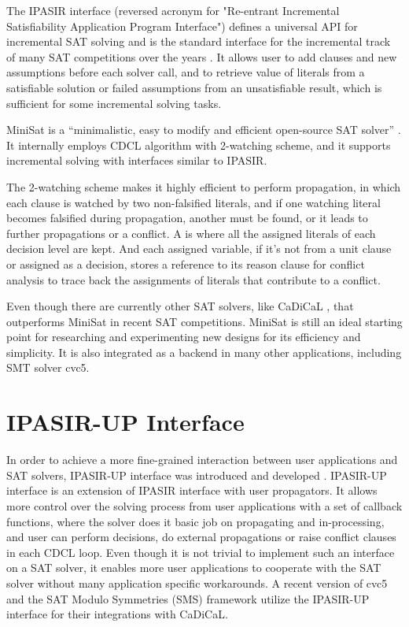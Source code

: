 The IPASIR interface (reversed acronym for "Re-entrant Incremental Satisfiability Application Program Interface") defines a universal API for incremental SAT solving and is the standard interface for the incremental track of many SAT competitions over the years \cite{BALYO201645}. It allows user to add clauses and new assumptions before each solver call, and to retrieve value of literals from a satisfiable solution or failed assumptions from an unsatisfiable result, which is sufficient for some incremental solving tasks.

MiniSat is a ``minimalistic, easy to modify and efficient open-source SAT solver'' \cite{10.1007/978-3-540-24605-3_37}. It internally employs CDCL algorithm with 2-watching scheme, and it supports incremental solving with interfaces similar to IPASIR.

The 2-watching scheme makes it highly efficient to perform propagation, in which each clause is watched by two non-falsified literals, and if one watching literal becomes falsified during propagation, another must be found, or it leads to further propagations or a conflict. A  is where all the assigned literals of each decision level are kept. And each assigned variable, if it's not from a unit clause or assigned as a decision, stores a reference to its reason clause for conflict analysis to trace back the assignments of literals that contribute to a conflict.

Even though there are currently other SAT solvers, like CaDiCaL \cite{BiereFallerFazekasFleuryFroleyks-CAV24}, that outperforms MiniSat in recent SAT competitions. MiniSat is still an ideal starting point for researching and experimenting new designs for its efficiency and simplicity. It is also integrated as a backend in many other applications, including SMT solver cvc5.

\section{IPASIR-UP Interface}

In order to achieve a more fine-grained interaction between user applications and SAT solvers, IPASIR-UP interface was introduced and developed \cite{fazekas_et_al:LIPIcs.SAT.2023.8}\cite{FazekasNiemetzPreinerKirchwegerSzeiderBiere-JAIR24}. IPASIR-UP interface is an extension of IPASIR interface with user propagators. It allows more control over the solving process from user applications with a set of callback functions, where the solver does it basic job on propagating and in-processing, and user can perform decisions, do external propagations or raise conflict clauses in each CDCL loop. Even though it is not trivial to implement such an interface on a SAT solver, it enables more user applications to cooperate with the SAT solver without many application specific workarounds. A recent version of cvc5 and the SAT Modulo Symmetries (SMS) framework utilize the IPASIR-UP interface for their integrations with CaDiCaL.

